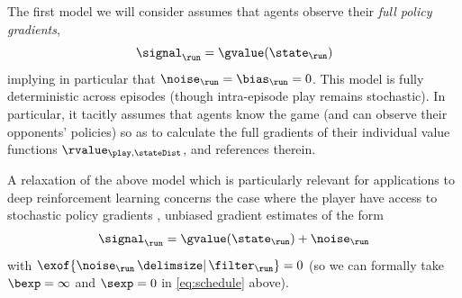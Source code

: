 \begin{model}
\label{mod:full}
The first model we will consider assumes that agents observe their \emph{full policy gradients}, \ie
\begin{equation}
\label{eq:signal-full}
\curr[\signal]
	= \gvalue(\curr)
\end{equation}
implying in particular that $\curr[\noise] = \curr[\bias] = 0$.
This model is fully deterministic across episodes (though intra-episode play remains stochastic).
In particular, it tacitly assumes that agents know the game (and can observe their opponents' policies) so as to calculate the full gradients of their individual value functions $\rvalue_{\play,\stateDist}$, \cf \cite{zhang2021gradient,agarwal2021theory,LOPP22} and references therein.
\endenv
\end{model}


\begin{model}
\label{mod:stoch}
A relaxation of the above model which is particularly relevant for applications to deep reinforcement learning concerns the case where the player have access to stochastic policy gradients \cite{zhang2020global}, \ie unbiased gradient estimates of the form
\begin{equation}
\label{eq:signal-stoch}
\curr[\signal]
	= \gvalue(\curr)
	+ \curr[\noise]
\end{equation}
with $\exof{\curr[\noise] \given \curr[\filter]} = 0$ (so we can formally take $\bexp = \infty$ and $\sexp = 0$ in \cref{eq:schedule}
 above).
\endenv
\end{model}



